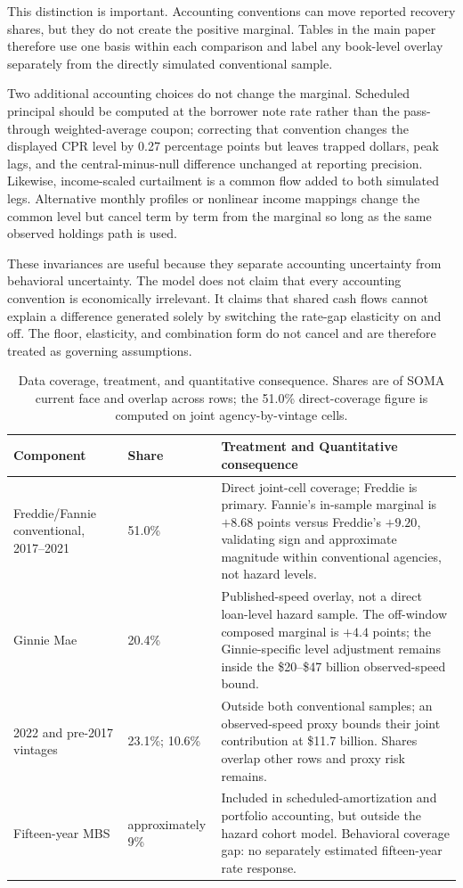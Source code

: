 This distinction is important. Accounting conventions can move reported recovery shares, but they do not create the positive marginal. Tables in the main paper therefore use one basis within each comparison and label any book-level overlay separately from the directly simulated conventional sample.

Two additional accounting choices do not change the marginal. Scheduled principal should be computed at the borrower note rate rather than the pass-through weighted-average coupon; correcting that convention changes the displayed CPR level by 0.27 percentage points but leaves trapped dollars, peak lags, and the central-minus-null difference unchanged at reporting precision. Likewise, income-scaled curtailment is a common flow added to both simulated legs. Alternative monthly profiles or nonlinear income mappings change the common level but cancel term by term from the marginal so long as the same observed holdings path is used.

These invariances are useful because they separate accounting uncertainty from behavioral uncertainty. The model does not claim that every accounting convention is economically irrelevant. It claims that shared cash flows cannot explain a difference generated solely by switching the rate-gap elasticity on and off. The floor, elasticity, and combination form do not cancel and are therefore treated as governing assumptions.

\begin{table}[H]
\centering
\small
\caption{Data coverage, treatment, and quantitative consequence. Shares are of SOMA current face and overlap across rows; the 51.0\% direct-coverage figure is computed on joint agency-by-vintage cells.}
\label{tab:coverage}\label{tab:bases}
\begin{tabular}{@{}p{3.3cm}p{1.8cm}p{9.6cm}@{}}
\toprule
Component & Share & Treatment and Quantitative consequence \\
\midrule
Freddie/Fannie conventional, 2017--2021 & 51.0\% & Direct joint-cell coverage; Freddie is primary. Fannie's in-sample marginal is $+8.68$ points versus Freddie's $+9.20$, validating sign and approximate magnitude within conventional agencies, not hazard levels. \\
Ginnie Mae & 20.4\% & Published-speed overlay, not a direct loan-level hazard sample. The off-window composed marginal is $+4.4$ points; the Ginnie-specific level adjustment remains inside the \$20--\$47 billion observed-speed bound. \\
2022 and pre-2017 vintages & 23.1\%; 10.6\% & Outside both conventional samples; an observed-speed proxy bounds their joint contribution at \$11.7 billion. Shares overlap other rows and proxy risk remains. \\
Fifteen-year MBS & approximately 9\% & Included in scheduled-amortization and portfolio accounting, but outside the hazard cohort model. Behavioral coverage gap: no separately estimated fifteen-year rate response. \\
\bottomrule
\end{tabular}
\end{table}

